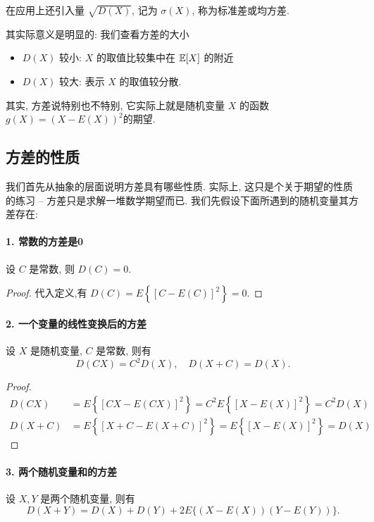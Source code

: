 在应用上还引入量 $\sqrt{D(X)}$, 记为 $\sigma(X)$, 称为标准差或均方差.

其实际意义是明显的: 我们查看方差的大小
\begin{itemize}
    \item $D(X)$ 较小:  $X$ 的取值比较集中在 $\mathbb E[X] $ 的附近
    \item $D(X)$ 较大: 表示 $X$ 的取值较分散.
\end{itemize}

其实, 方差说特别也不特别, 它实际上就是随机变量 $X$ 的函数 $g(X)=(X-E(X))^2$的期望. 



   \subsection{方差的性质}

   我们首先从抽象的层面说明方差具有哪些性质. 实际上, 这只是个关于期望的性质的练习 -- 方差只是求解一堆数学期望而已. 我们先假设下面所遇到的随机变量其方差存在: 

   \paragraph{1. 常数的方差是0} 设 $C$ 是常数, 则 $D(C)=0$.
   \begin{proof}
    代入定义,有 $D(C)=E\left\{[C-E(C)]^2\right\}=0$.
   \end{proof}


   \paragraph{2. 一个变量的线性变换后的方差} 设 $X$ 是随机变量, $C$ 是常数, 则有
   $$
   D(C X)=C^2 D(X), \quad D(X+C)=D(X) .
   $$

   \begin{proof}
    
    $$
\begin{aligned}
D(C X) & =E\left\{[C X-E(C X)]^2\right\}=C^2 E\left\{[X-E(X)]^2\right\}=C^2 D(X) \\
D(X+C) & =E\left\{[X+C-E(X+C)]^2\right\}=E\left\{[X-E(X)]^2\right\}=D(X)
\end{aligned}
$$
   \end{proof}

   \paragraph{3. 两个随机变量和的方差} 设 $X, Y$ 是两个随机变量, 则有
   $$
   D(X+Y)=D(X)+D(Y)+2 E\{(X-E(X))(Y-E(Y))\} .
   $$
   
